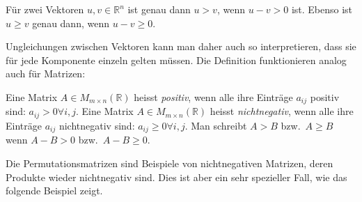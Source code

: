 \begin{definition}
Für zwei Vektoren $u,v\in\mathbb{R}^n$ ist genau dann $u>v$, wenn
$u-v > 0$ ist.
Ebenso ist $u\ge v$ genau dann, wenn $u-v\ge 0$.
\end{definition}

Ungleichungen zwischen Vektoren kann man daher auch so interpretieren,
dass sie für jede Komponente einzeln gelten müssen.
Die Definition funktionieren analog auch für Matrizen:

\begin{definition}
Eine Matrix $A\in M_{m\times n}(\mathbb{R})$  heisst {\em positiv},
wenn alle ihre Einträge $a_{i\!j}$ positiv sind: $a_{i\!j}>0\forall i,j$.
Eine Matrix $A\in M_{m\times n}(\mathbb{R})$  heisst {\em nichtnegativ},
wenn alle ihre Einträge $a_{i\!j}$ nichtnegativ sind: $a_{i\!j}\ge 0\forall i,j$.
%
%
Man schreibt $A>B$ bzw.~$A\ge B$ wenn $A-B>0$ bzw.~$A-B\ge 0$.
\end{definition}

Die Permutationsmatrizen sind Beispiele von nichtnegativen Matrizen,
deren Produkte wieder nichtnegativ sind.
Dies ist aber ein sehr spezieller Fall, wie das folgende Beispiel
zeigt.


